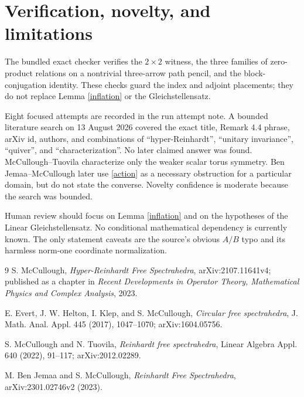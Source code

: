 \documentclass[11pt]{article}
\begin{document}
\section{Verification, novelty, and limitations}

The bundled exact checker verifies the $2\times2$ witness, the three families
of zero-product relations on a nontrivial three-arrow path pencil, and the
block-conjugation identity.  These checks guard the index and adjoint
placements; they do not replace Lemma \ref{inflation} or the
Gleichstellensatz.

Eight focused attempts are recorded in the run attempt note.  A bounded
literature search on 13 August 2026 covered the exact title, Remark 4.4 phrase,
arXiv id, authors, and combinations of ``hyper-Reinhardt'', ``unitary
invariance'', ``quiver'', and ``characterization''.  No later claimed answer
was found.  McCullough--Tuovila \cite{MT} characterize only the weaker scalar
torus symmetry.  Ben Jemaa--McCullough \cite{BJM} later use \eqref{action} as
a necessary obstruction for a particular domain, but do not state the
converse.  Novelty confidence is moderate because the search was bounded.

Human review should focus on Lemma \ref{inflation} and on the hypotheses of
the Linear Gleichstellensatz.  No conditional mathematical dependency is
currently known.  The only statement caveats are the source's obvious
$A/B$ typo and its harmless norm-one coordinate normalization.

\begin{thebibliography}{9}
S. McCullough,
\emph{Hyper-Reinhardt Free Spectrahedra},
arXiv:2107.11641v4; published as a chapter in
\emph{Recent Developments in Operator Theory, Mathematical Physics and
Complex Analysis}, 2023.

E. Evert, J. W. Helton, I. Klep, and S. McCullough,
\emph{Circular free spectrahedra},
J. Math. Anal. Appl. 445 (2017), 1047--1070;
arXiv:1604.05756.

S. McCullough and N. Tuovila,
\emph{Reinhardt free spectrahedra},
Linear Algebra Appl. 640 (2022), 91--117;
arXiv:2012.02289.

M. Ben Jemaa and S. McCullough,
\emph{Reinhardt Free Spectrahedra},
arXiv:2301.02746v2 (2023).
\end{thebibliography}
\end{document}
